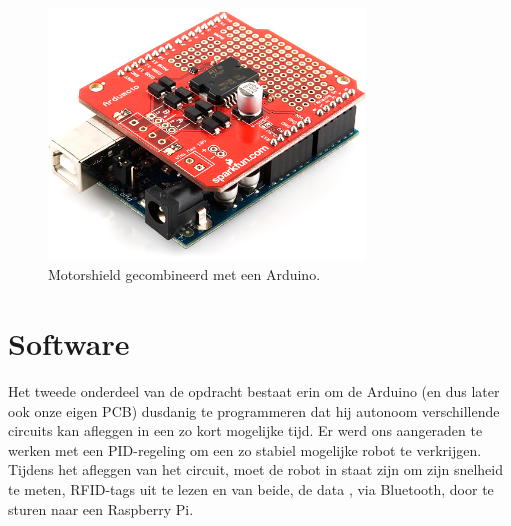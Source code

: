\begin{figure}[H]
\centering
\includegraphics[width=0.75\textwidth]{ArduMoto.png}
\caption{Motorshield gecombineerd met een Arduino. \label{fig:ArduMoto}}
\end{figure}

\section{Software}
Het tweede onderdeel van de opdracht bestaat erin om de Arduino (en dus later ook onze eigen PCB) dusdanig te programmeren dat hij autonoom verschillende circuits kan afleggen in een zo kort mogelijke tijd. Er werd ons aangeraden te werken met een PID-regeling om een zo stabiel mogelijke robot te verkrijgen. Tijdens het afleggen van het circuit, moet de robot in staat zijn om zijn snelheid te meten, RFID-tags uit te lezen en van beide, de data , via Bluetooth, door te sturen naar een Raspberry Pi.

 



